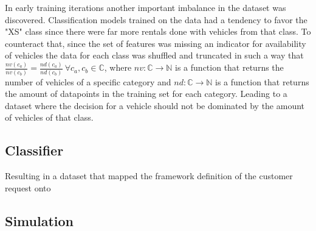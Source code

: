 In early training iterations another important imbalance in the dataset was discovered. Classification models
trained on the data had a tendency to favor the "XS" class since there were far more rentals done with
vehicles from that class. To counteract that, since the set of features was missing an indicator for availability
of vehicles the data for each class was shuffled and truncated in such a way that
$\frac{nv(c_a)}{nv(c_b)} = \frac{nd(c_a)}{nd(c_b)} \ \forall c_a, c_b \in \mathbb{C}$, where $nv: \mathbb{C} \to \mathbb{N}$ is a function
that returns the number of vehicles of a specific category and $nd: \mathbb{C} \to \mathbb{N}$ is a function that returns the
amount of datapoints in the training set for each category. Leading to a dataset where the decision for a vehicle
should not be dominated by the amount of vehicles of that class.

\subsection{Classifier}
\label{sub_sec:CaseStudy/Classifier}

Resulting in a dataset that mapped the framework definition of the customer request onto 


\subsection{Simulation}
\label{sub_sec:CaseStudy/Simulation}